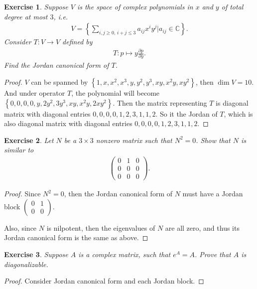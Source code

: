 \documentclass[10pt]{book}
\newtheorem{exercise}{Exercise}[section]
\theoremstyle{definition}
\numberwithin{equation}{chapter}
\begin{document}
\medskip

\begin{exercise}
Suppose $V$ is the space of complex polynomials in $x$ and $y$ of total degree at most $3$, i.e.
\begin{align*}
    V = \left\{\sum_{i,j \geq 0,\,i+j \leq 3} a_{ij} x^i y^j \Bigg| a_{ij} \in \mathbb{C} \right\}.
\end{align*}
Consider $T: V \to V$ defined by 
\begin{align*}
    T: p \mapsto y \frac{\partial p}{\partial y}.
\end{align*}
Find the Jordan canonical form of $T$.
\end{exercise}
\begin{proof}
$V$ can be spanned by $\left\{1, x, x^2, x^3, y, y^2, y^3, xy, x^2y, xy^2\right\}$, then $\dim V = 10$. And under operator $T$, the polynomial will become $\left\{0, 0, 0, 0, y, 2y^2, 3y^3, xy, x^2y, 2xy^2\right\}$. Then the matrix representing $T$ is diagonal matrix with diagonal entries $0,0,0,0,1,2,3,1,1,2$. So it the Jordan of $T$, which is also diagonal matrix with diagonal entries $0,0,0,0,1,2,3,1,1,2$.
\end{proof}


\medskip

\begin{exercise}
Let $N$ be a $3 \times 3$ nonzero matrix such that $N^2 = 0$. Show that $N$ is similar to
\begin{align*}
    \begin{pmatrix}
        0 & 1 & 0 \\
        0 & 0 & 0 \\
        0 & 0 & 0
    \end{pmatrix}.
\end{align*}
\end{exercise}
\begin{proof}
Since $N^2 = 0$, then the Jordan canonical form of $N$ must have a Jordan block $\begin{pmatrix}
    0 & 1 \\
    0 & 0 
\end{pmatrix}$.

Also, since $N$ is nilpotent, then the eigenvalues of $N$ are all zero, and thus its Jordan canonical form is the same as above. 
\end{proof}

\medskip

\begin{exercise}
Suppose $A$ is a complex matrix, such that $e^A = A$. Prove that $A$ is diagonalizable.
\end{exercise}
\begin{proof}
Consider Jordan canonical form and each Jordan block.
\end{proof}
\end{document}
